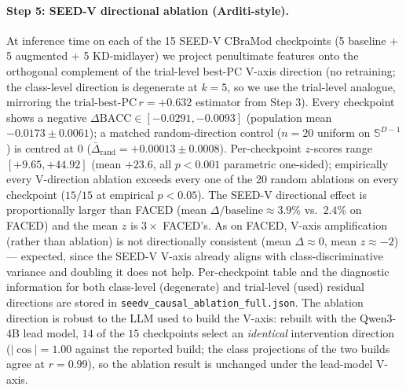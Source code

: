 \paragraph{Step 5: SEED-V directional ablation (Arditi-style).}
At inference time on each of the 15 SEED-V CBraMod checkpoints (5
baseline + 5 augmented + 5 KD-midlayer) we project penultimate features
onto the orthogonal complement of the trial-level best-PC V-axis
direction (no retraining; the class-level direction is degenerate at
$k{=}5$, so we use the trial-level analogue, mirroring the
$\text{trial-best-PC}\,r{=}+0.632$ estimator from Step 3). Every
checkpoint shows a negative $\Delta\mathrm{BACC} \in [-0.0291,
-0.0093]$ (population mean $-0.0173 \pm 0.0061$); a matched
random-direction control ($n=20$ uniform on $\mathbb{S}^{D-1}$) is
centred at $0$ ($\bar{\Delta}_{\mathrm{rand}}=+0.00013 \pm 0.0008$).
Per-checkpoint $z$-scores range $[+9.65, +44.92]$ (mean $+23.6$, all
$p<0.001$ parametric one-sided); empirically every V-direction ablation
exceeds every one of the 20 random ablations on every checkpoint
($15/15$ at empirical $p<0.05$). The SEED-V directional effect is
proportionally larger than FACED (mean $\Delta/\mathrm{baseline}\approx
3.9\%$ vs.\ $2.4\%$ on FACED) and the mean $z$ is $3\times$ FACED's. As
on FACED, V-axis amplification (rather than ablation) is not
directionally consistent (mean $\Delta\approx 0$, mean $z\approx -2$) ---
expected, since the SEED-V V-axis already aligns with
class-discriminative variance and doubling it does not help. Per-checkpoint
table and the diagnostic information for both class-level (degenerate)
and trial-level (used) residual directions are stored in
\texttt{seedv\_causal\_ablation\_full.json}. The ablation direction is
robust to the LLM used to build the V-axis: rebuilt with the Qwen3-4B
lead model, $14$ of the $15$ checkpoints select an \emph{identical}
intervention direction ($|\cos|{=}1.00$ against the reported build; the
class projections of the two builds agree at $r=0.99$), so the ablation
result is unchanged under the lead-model V-axis.

